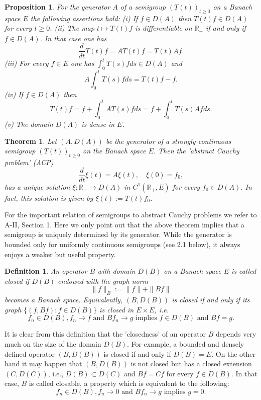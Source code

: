 \documentclass{article}
\newtheorem{definition}{Definition}
\newtheorem{theorem}{Theorem}
\newtheorem{proposition}{Proposition}
\begin{document}
\begin{proposition}
For the generator $A$ of a semigroup $(T(t))_{t \geq 0}$ on a Banach space $E$ the following assertions hold:
(i) If $f \in D(A)$ then $T(t)f \in D(A)$ for every $t \geq 0$.
(ii) The map $t \mapsto T(t)f$ is differentiable on $\mathbb{R}_{+}$ if and only if $f \in D(A)$.
In that case one has
\begin{equation}
\frac{d}{dt}T(t)f = AT(t)f = T(t)Af.
\end{equation}
(iii) For every $f \in E$ one has $\int_0^t T(s)f ds \in D(A)$ and
\begin{equation}
A\int_0^t T(s)f ds = T(t)f - f.
\end{equation}
(iv) If $f \in D(A)$ then
\[
T(t)f = f + \int_0^t AT(s)f ds = f + \int_0^t T(s)Af ds.
\]
(v) The domain $D(A)$ is dense in $E$.
\end{proposition}

\begin{theorem}
Let $(A,D(A))$ be the generator of a strongly continuous semigroup $(T(t))_{t \geq 0}$ on the Banach space $E$.
Then the 'abstract Cauchy problem' (ACP)
\[
\frac{d}{dt}\xi(t) = A\xi(t), \quad \xi(0) = f_0,
\]
has a unique solution $\xi: \mathbb{R}_{+} \to D(A)$ in $C^1(\mathbb{R}_{+},E)$ for every $f_0 \in D(A)$.
In fact, this solution is given by $\xi(t) := T(t)f_0$.
\end{theorem}

For the important relation of semigroups to abstract Cauchy problems we refer to A-II, Section 1.
Here we only point out that the above theorem implies that a semigroup is uniquely determined by its generator.
While the generator is bounded only for uniformly continuous semigroups (see 2.1 below), it always enjoys a weaker but useful property.

\begin{definition}
An operator $B$ with domain $D(B)$ on a Banach space $E$ is called closed if $D(B)$ endowed with the graph norm
\[
\|f\|_B := \|f\| + \|Bf\|
\]
becomes a Banach space.
Equivalently, $(B,D(B))$ is closed if and only if its graph $\{(f,Bf): f \in D(B)\}$ is closed in $E \times E$, i.e.
\begin{equation}
f_n \in D(B), f_n \to f \text{ and } Bf_n \to g \text{ implies } f \in D(B) \text{ and } Bf = g.
\end{equation}
\end{definition}

It is clear from this definition that the 'closedness' of an operator $B$ depends very much on the size of the domain $D(B)$.
For example, a bounded and densely defined operator $(B,D(B))$ is closed if and only if $D(B) = E$.
On the other hand it may happen that $(B,D(B))$ is not closed but has a closed extension $(C,D(C))$, i.e., $D(B) \subset D(C)$ and $Bf = Cf$ for every $f \in D(B)$.
In that case, $B$ is called closable, a property which is equivalent to the following:
\begin{equation}
f_n \in D(B), f_n \to 0 \text{ and } Bf_n \to g \text{ implies } g = 0.
\end{equation}
\end{document}
